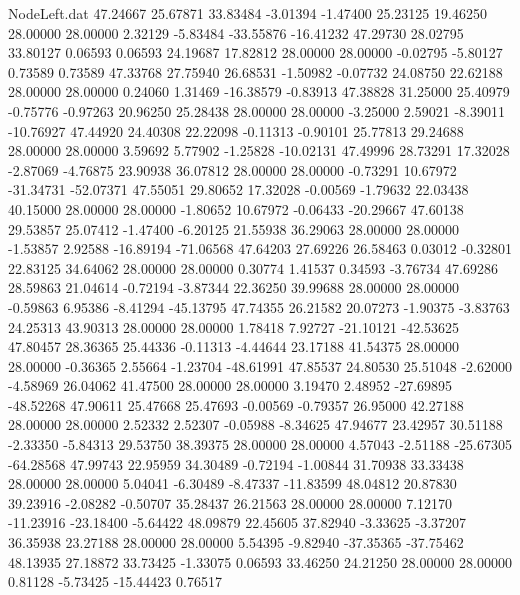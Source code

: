 \begin{filecontents}{NodeLeft.dat}
  47.24667   25.67871   33.83484    -3.01394   -1.47400   25.23125   19.46250   28.00000   28.00000    2.32129   -5.83484  -33.55876  -16.41232
  47.29730   28.02795   33.80127     0.06593    0.06593   24.19687   17.82812   28.00000   28.00000   -0.02795   -5.80127    0.73589    0.73589
  47.33768   27.75940   26.68531    -1.50982   -0.07732   24.08750   22.62188   28.00000   28.00000    0.24060    1.31469  -16.38579   -0.83913
  47.38828   31.25000   25.40979    -0.75776   -0.97263   20.96250   25.28438   28.00000   28.00000   -3.25000    2.59021   -8.39011  -10.76927
  47.44920   24.40308   22.22098    -0.11313   -0.90101   25.77813   29.24688   28.00000   28.00000    3.59692    5.77902   -1.25828  -10.02131
  47.49996   28.73291   17.32028    -2.87069   -4.76875   23.90938   36.07812   28.00000   28.00000   -0.73291   10.67972  -31.34731  -52.07371
  47.55051   29.80652   17.32028    -0.00569   -1.79632   22.03438   40.15000   28.00000   28.00000   -1.80652   10.67972   -0.06433  -20.29667
  47.60138   29.53857   25.07412    -1.47400   -6.20125   21.55938   36.29063   28.00000   28.00000   -1.53857    2.92588  -16.89194  -71.06568
  47.64203   27.69226   26.58463     0.03012   -0.32801   22.83125   34.64062   28.00000   28.00000    0.30774    1.41537    0.34593   -3.76734
  47.69286   28.59863   21.04614    -0.72194   -3.87344   22.36250   39.99688   28.00000   28.00000   -0.59863    6.95386   -8.41294  -45.13795
  47.74355   26.21582   20.07273    -1.90375   -3.83763   24.25313   43.90313   28.00000   28.00000    1.78418    7.92727  -21.10121  -42.53625
  47.80457   28.36365   25.44336    -0.11313   -4.44644   23.17188   41.54375   28.00000   28.00000   -0.36365    2.55664   -1.23704  -48.61991
  47.85537   24.80530   25.51048    -2.62000   -4.58969   26.04062   41.47500   28.00000   28.00000    3.19470    2.48952  -27.69895  -48.52268
  47.90611   25.47668   25.47693    -0.00569   -0.79357   26.95000   42.27188   28.00000   28.00000    2.52332    2.52307   -0.05988   -8.34625
  47.94677   23.42957   30.51188    -2.33350   -5.84313   29.53750   38.39375   28.00000   28.00000    4.57043   -2.51188  -25.67305  -64.28568
  47.99743   22.95959   34.30489    -0.72194   -1.00844   31.70938   33.33438   28.00000   28.00000    5.04041   -6.30489   -8.47337  -11.83599
  48.04812   20.87830   39.23916    -2.08282   -0.50707   35.28437   26.21563   28.00000   28.00000    7.12170  -11.23916  -23.18400   -5.64422
  48.09879   22.45605   37.82940    -3.33625   -3.37207   36.35938   23.27188   28.00000   28.00000    5.54395   -9.82940  -37.35365  -37.75462
  48.13935   27.18872   33.73425    -1.33075    0.06593   33.46250   24.21250   28.00000   28.00000    0.81128   -5.73425  -15.44423    0.76517

\end{filecontents}
